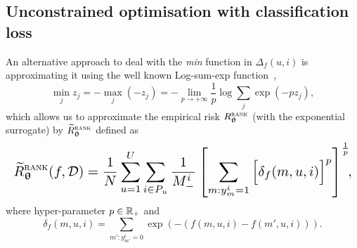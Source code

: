 %




\subsection{Unconstrained optimisation with classification loss}

An alternative approach to deal with the \emph{min} function in $\Delta_f(u, i)$ 
is approximating it using the well known Log-sum-exp function~\cite[p. 72]{boyd2004convex},
\begin{equation*}
  \displaystyle \min_j z_j 
= \displaystyle -\max_j (-z_j) 
= \displaystyle -\lim_{p \to +\infty} \frac{1}{p} \log \sum_j \exp(-p z_j),
\end{equation*}
which allows us to approximate the empirical risk $R_{{\bm{\uptheta}}}^{\textsc{rank}}$ (with the exponential surrogate)
by $\widetilde R_{{\bm{\uptheta}}}^{\textsc{rank}}$ defined as
\begin{equation*}
\resizebox{\columnwidth}{!}{$
\begin{aligned}
\widetilde R_{\upthetabm}^{\textsc{rank}}(f, \DCal)
= \frac{1}{N} \sum_{u=1}^U \sum_{i \in P_u} \frac{1}{M_-^i} \left[
  \sum_{m: y_m^i = 1} \Big[ \delta_f(m, u, i) \Big]^p \right]^\frac{1}{p} \!\! ,
\end{aligned}
$}
\end{equation*}
where hyper-parameter $p \in \mathbb{R}_+$ and
$$
\delta_f(m, u, i) = \!\! \sum_{m': y_{m'}^i = 0} \!\! \exp(-(f(m, u, i) - f(m', u, i))).
$$


